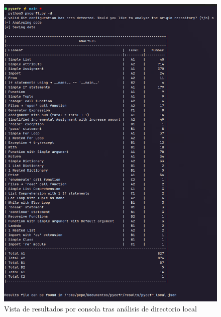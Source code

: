 \documentclass[a4paper, 12pt]{book}
\begin{document}
\clearpage

\begin{figure}[H]
  \centering
  \includegraphics[width=\linewidth, keepaspectratio]{img/execution_local.png}
  \caption{Vista de resultados por consola tras análisis de directorio local}
  \label{fig:execution_local}
\end{figure}
\end{document}
